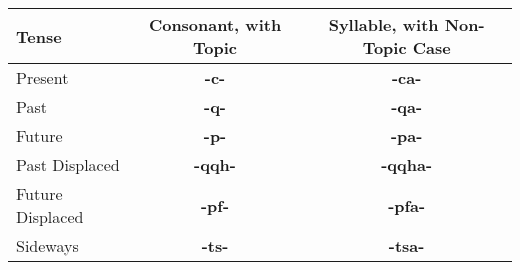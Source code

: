 \documentclass{article}
\begin{document}
\begin{table}[h]
\begin{tabular}{l|c c}
Tense & Consonant, with Topic & Syllable, with Non-Topic Case \\
\hline
Present & \textbf{-c-} & \textbf{-ca-} \\
Past & \textbf{-q-} & \textbf{-qa-} \\
Future & \textbf{-p-} & \textbf{-pa-} \\
Past Displaced & \textbf{-qqh-} & \textbf{-qqha-} \\
Future Displaced & \textbf{-pf-} & \textbf{-pfa-} \\
Sideways & \textbf{-ts-} & \textbf{-tsa-} \\
\end{tabular}
\end{table}
\end{document}
